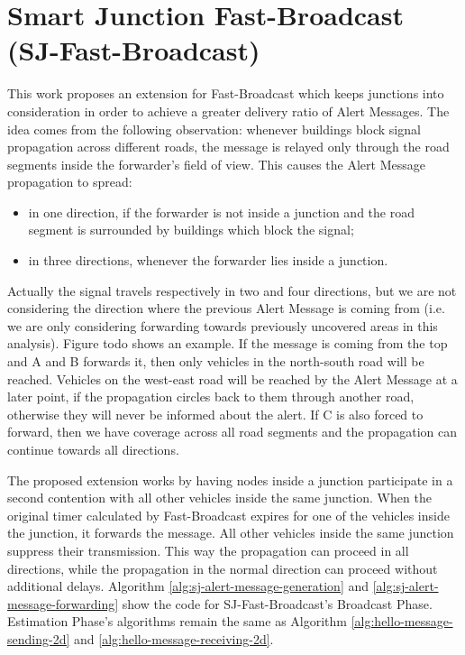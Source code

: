 	\section{Smart Junction Fast-Broadcast (SJ-Fast-Broadcast)}
		\label{sj:fb}
		This work proposes an extension for Fast-Broadcast which keeps junctions into consideration in order to achieve a greater delivery ratio of Alert Messages. The idea comes from the following observation: whenever buildings block signal propagation across different roads, the message is relayed only through the road segments inside the forwarder's field of view. This causes the Alert Message propagation to spread:
		\begin{itemize}
			\item in one direction, if the forwarder is not inside a junction and the road segment is surrounded by buildings which block the signal;
			\item in three directions, whenever the forwarder lies inside a junction. 
		\end{itemize}
		Actually the signal travels respectively in two and four directions, but we are not considering the direction where the previous Alert Message is coming from (i.e. we are only considering forwarding towards previously uncovered areas in this analysis). Figure todo shows an example.
		If the message is coming from the top and A and B forwards it, then only vehicles in the north-south road will be reached. Vehicles on the west-east road will be reached by the Alert Message at a later point, if the propagation circles back to them through another road, otherwise they will never be informed about the alert. If C is also forced to forward, then we have coverage across all road segments and the propagation can continue towards all directions.
		
		
		The proposed extension works by having nodes inside a junction participate in a second contention with all other vehicles inside the same junction. When the original timer calculated by Fast-Broadcast expires for one of the vehicles inside the junction, it forwards the message. All other vehicles inside the same junction suppress their transmission. This way the propagation can proceed in all directions, while the propagation in the normal direction can proceed without additional delays. Algorithm \ref{alg:sj-alert-message-generation} and \ref{alg:sj-alert-message-forwarding} show the code for SJ-Fast-Broadcast's Broadcast Phase. Estimation Phase's algorithms remain the same as Algorithm \ref{alg:hello-message-sending-2d} and \ref{alg:hello-message-receiving-2d}.
		
